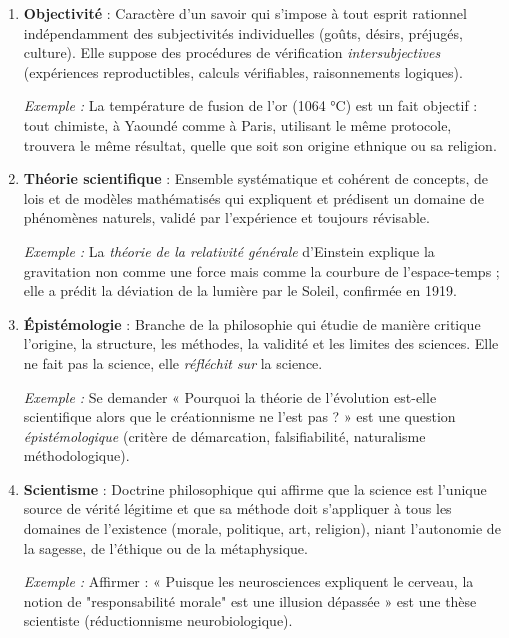 \documentclass[11pt]{article}
\newcommand{\cle}[1]{{\popxbold\color{popdark}#1}}
\begin{document}
\begin{corrige}
\begin{enumerate}
\item \textbf{\cle{Objectivité}} : Caractère d'un savoir qui s'impose à tout esprit rationnel indépendamment des subjectivités individuelles (goûts, désirs, préjugés, culture). Elle suppose des procédures de vérification \emph{intersubjectives} (expériences reproductibles, calculs vérifiables, raisonnements logiques).
\par\emph{Exemple :} La température de fusion de l'or (1064 °C) est un fait objectif : tout chimiste, à Yaoundé comme à Paris, utilisant le même protocole, trouvera le même résultat, quelle que soit son origine ethnique ou sa religion.

\item \textbf{\cle{Théorie scientifique}} : Ensemble systématique et cohérent de concepts, de lois et de modèles mathématisés qui expliquent et prédisent un domaine de phénomènes naturels, validé par l'expérience et toujours révisable.
\par\emph{Exemple :} La \emph{théorie de la relativité générale} d'Einstein explique la gravitation non comme une force mais comme la courbure de l'espace-temps ; elle a prédit la déviation de la lumière par le Soleil, confirmée en 1919.

\item \textbf{\cle{Épistémologie}} : Branche de la philosophie qui étudie de manière critique l'origine, la structure, les méthodes, la validité et les limites des sciences. Elle ne fait pas la science, elle \emph{réfléchit sur} la science.
\par\emph{Exemple :} Se demander « Pourquoi la théorie de l'évolution est-elle scientifique alors que le créationnisme ne l'est pas ? » est une question \emph{épistémologique} (critère de démarcation, falsifiabilité, naturalisme méthodologique).

\item \textbf{\cle{Scientisme}} : Doctrine philosophique qui affirme que la science est l'unique source de vérité légitime et que sa méthode doit s'appliquer à tous les domaines de l'existence (morale, politique, art, religion), niant l'autonomie de la sagesse, de l'éthique ou de la métaphysique.
\par\emph{Exemple :} Affirmer : « Puisque les neurosciences expliquent le cerveau, la notion de "responsabilité morale" est une illusion dépassée » est une thèse scientiste (réductionnisme neurobiologique).


\end{enumerate}
\end{corrige}
\end{document}
